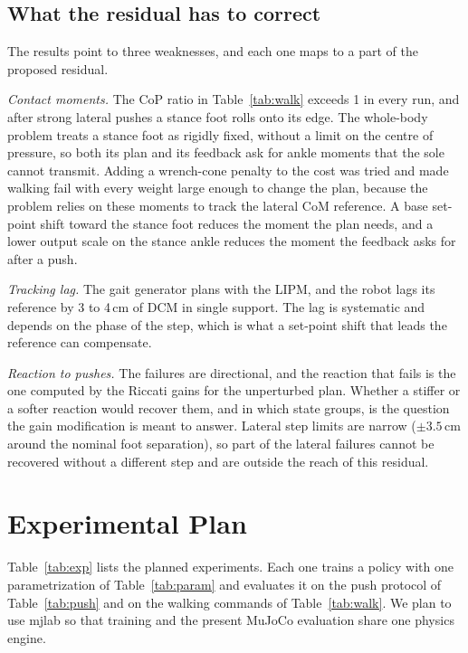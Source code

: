 \documentclass[conference]{IEEEtran}
\begin{document}
\subsection{What the residual has to correct}
The results point to three weaknesses, and each one maps to a part of the proposed residual.

\emph{Contact moments.} The CoP ratio in Table~\ref{tab:walk} exceeds 1 in every run, and after strong lateral pushes a stance foot rolls onto its edge.
The whole-body problem treats a stance foot as rigidly fixed, without a limit on the centre of pressure, so both its plan and its feedback ask for ankle moments that the sole cannot transmit.
Adding a wrench-cone penalty to the cost was tried and made walking fail with every weight large enough to change the plan, because the problem relies on these moments to track the lateral CoM reference.
A base set-point shift toward the stance foot reduces the moment the plan needs, and a lower output scale on the stance ankle reduces the moment the feedback asks for after a push.

\emph{Tracking lag.} The gait generator plans with the LIPM, and the robot lags its reference by 3 to 4\,cm of DCM in single support.
The lag is systematic and depends on the phase of the step, which is what a set-point shift that leads the reference can compensate.

\emph{Reaction to pushes.} The failures are directional, and the reaction that fails is the one computed by the Riccati gains for the unperturbed plan.
Whether a stiffer or a softer reaction would recover them, and in which state groups, is the question the gain modification is meant to answer.
Lateral step limits are narrow ($\pm3.5$\,cm around the nominal foot separation), so part of the lateral failures cannot be recovered without a different step and are outside the reach of this residual.

\section{Experimental Plan}
\label{sec:plan}

Table~\ref{tab:exp} lists the planned experiments.
Each one trains a policy with one parametrization of Table~\ref{tab:param} and evaluates it on the push protocol of Table~\ref{tab:push} and on the walking commands of Table~\ref{tab:walk}.
We plan to use mjlab \cite{zakka2026mjlab} so that training and the present MuJoCo evaluation share one physics engine.
\end{document}

